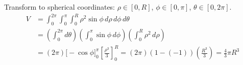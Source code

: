 \begin{solutionbox}
Transform to spherical coordinates:
$\rho \in [0, R]$, $\phi \in [0, \pi]$, $\theta \in [0, 2\pi]$.
\begin{align}
V &= \int_0^{2\pi} \int_0^\pi \int_0^R \rho^2 \sin\phi \, d\rho \, d\phi \, d\theta \\
&= \left( \int_0^{2\pi} d\theta \right) \left( \int_0^\pi \sin\phi \, d\phi \right) \left( \int_0^R \rho^2 \, d\rho \right) \\
&= (2\pi) \Big[ -\cos\phi \Big]_0^\pi \left[ \frac{\rho^3}{3} \right]_0^R = (2\pi)(1 - (-1))\left( \frac{R^3}{3} \right) = \frac{4}{3}\pi R^3
\end{align}
\end{solutionbox}

